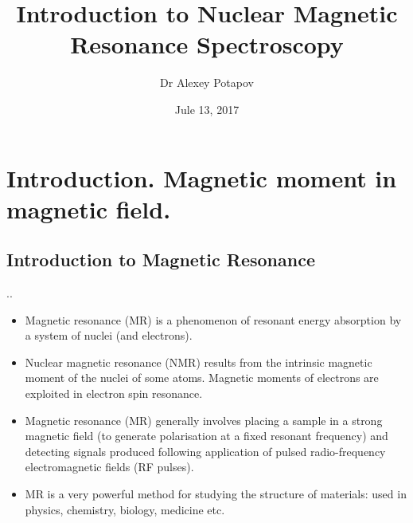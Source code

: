 \documentclass{beamer}
\title{Introduction to Nuclear Magnetic Resonance Spectroscopy}
\author{Dr Alexey Potapov}
\institute{University of Nottingham, School of Physics and Astronomy}
\date{Jule 13, 2017}
\begin{document}
	
	\begin{frame}
		\titlepage
	\end{frame}
	
	\section{Introduction. Magnetic moment in magnetic field.}
	\subsection{Introduction to Magnetic Resonance}	
	\begin{frame}{\thesection.\thesubsection. \insertsubsection}

		
		\begin{itemize}
		\item Magnetic resonance (MR) is a phenomenon of resonant energy absorption by a system of nuclei (and electrons). 
		\item Nuclear magnetic resonance (NMR) results from the intrinsic magnetic moment of the
		nuclei of some atoms. Magnetic moments of electrons are exploited in electron spin resonance.
		\item Magnetic resonance (MR) generally involves placing a sample in a strong magnetic
		field (to generate polarisation at a fixed resonant frequency) and detecting signals
		produced following application of pulsed radio-frequency electromagnetic fields (RF
		pulses).
		\item MR is a very powerful method for studying the structure of materials: used in physics, chemistry, biology, medicine etc.

		\end{itemize}
	\end{frame}
	
\end{document}
